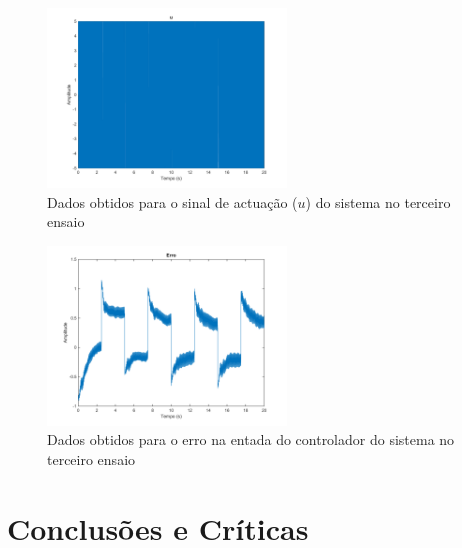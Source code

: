 \documentclass[%
  reprint,
  nofootinbib,
  amsmath,amssymb,
  aps,
  10pt,
  a4paper
]{revtex4-1}
\begin{document}
\begin{figure}
\includegraphics[width=2.5in]{../imgs/dados_00_g/dados_00_g_u.png}
\caption{Dados obtidos para o sinal de actuação ($u$) do sistema no terceiro ensaio}
\label{fig:u_f}
\end{figure}
\begin{figure}
\includegraphics[width=2.5in]{../imgs/dados_00_g/dados_00_g_err.png}
\caption{Dados obtidos para o erro na entada do controlador do sistema no terceiro ensaio}
\label{fig:erro}
\end{figure}
\label{s:conclu}
\section{Conclusões e Críticas}



\nocite{}
{}
\end{document}
